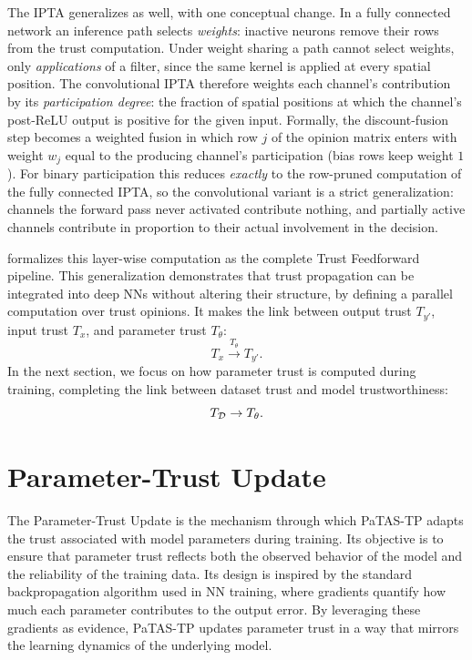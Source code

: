 The \ac{IPTA} generalizes as well, with one conceptual change. In a fully connected network an inference path selects \emph{weights}: inactive neurons remove their rows from the trust computation. Under weight sharing a path cannot select weights, only \emph{applications} of a filter, since the same kernel is applied at every spatial position. The convolutional \ac{IPTA} therefore weights each channel's contribution by its \emph{participation degree}: the fraction of spatial positions at which the channel's post-ReLU output is positive for the given input. Formally, the discount-fusion step becomes a weighted fusion in which row $j$ of the opinion matrix enters with weight $w_j$ equal to the producing channel's participation (bias rows keep weight $1$). For binary participation this reduces \emph{exactly} to the row-pruned computation of the fully connected \ac{IPTA}, so the convolutional variant is a strict generalization: channels the forward pass never activated contribute nothing, and partially active channels contribute in proportion to their actual involvement in the decision.

 formalizes this layer-wise computation as the complete Trust Feedforward pipeline. This generalization demonstrates that trust propagation can be integrated into deep \acp{NN} without altering their structure, by defining a parallel computation over trust opinions. It makes the link between output trust $T_{y'}$, input trust $T_{x}$, and parameter trust $T_{\theta}$: 
\[T_{x} \xrightarrow{T_\theta} T_{y'}.\] In the next section, we focus on how parameter trust is computed during training, completing the link between dataset trust and model trustworthiness:
\[T_{\mathcal{D}} \rightarrow T_\theta.\] 

\section{Parameter-Trust Update}\label{sec:param_update}
The Parameter-Trust Update is the mechanism through which \ac{PaTAS-TP} adapts the trust associated with model parameters during training. Its objective is to ensure that parameter trust reflects both the observed behavior of the model and the reliability of the training data. Its design is inspired by the standard backpropagation algorithm used in \ac{NN} training, where gradients quantify how much each parameter contributes to the output error. By leveraging these gradients as evidence, \ac{PaTAS-TP} updates parameter trust in a way that mirrors the learning dynamics of the underlying model.

